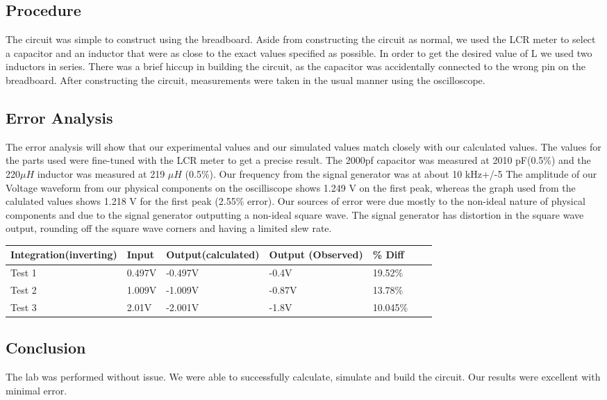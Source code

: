 \documentclass[11pt]{article}
\begin{document}
	\subsection*{Procedure}
		The circuit was simple to construct using the breadboard. Aside from constructing the circuit as normal, we used the LCR meter to select a capacitor and an inductor that were as close to the exact values specified as possible. In order to get the desired value of L we used two inductors in series. There was a brief hiccup in building the circuit, as the capacitor was accidentally connected to the wrong pin on the breadboard. After constructing the circuit, measurements were taken in the usual manner using the oscilloscope.
	\subsection*{Error Analysis}
	The error analysis will show that our experimental values and our simulated values match closely with our calculated values. The values for the parts used were fine-tuned with the LCR meter to get a precise result. The 2000pf capacitor was measured at 2010 pF(0.5\%) and the 220$\mu H$ inductor was measured at 219 $\mu H$  (0.5\%). Our frequency from the signal generator was at about 10 kHz+/-5%
	The amplitude of our Voltage waveform from our physical components on the oscilliscope shows 1.249 V on the first peak, whereas the graph used from the calulated values shows 1.218 V for the first peak (2.55\% error). 
	Our sources of error were due mostly to the non-ideal nature of physical components and due to the signal generator outputting a non-ideal square wave. The signal generator has distortion in the square wave output, rounding off the square wave corners and having a limited slew rate. 
\begin{table}[h]
		\def\arraystretch{1.2}%
		\begin{tabular}{|l|l|l|l|l|l|l|}
			\hline
			Integration(inverting)	& Input 		& Output(calculated)	& Output (Observed)					& \% Diff			\\ \hline
			Test 1					& 0.497V		& -0.497V				& -0.4V						&19.52\%			\\ \hline
			Test 2					& 1.009V		& -1.009V				& -0.87V					&13.78\%			\\ \hline
			Test 3					& 2.01V			& -2.001V				& -1.8V						&10.045\%			\\ \hline
		\end{tabular}
	\end{table}	
	\subsection*{Conclusion}
	The lab was performed without issue. We were able to successfully calculate, simulate and build the circuit. Our results were excellent with minimal error.   
\end{document}
